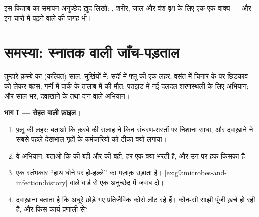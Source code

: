 \begin{exercise}[$\star\star\star$]\label{exo:g9:our-responsibility:12}
इस किताब का समापन अनुच्छेद ख़ुद लिखो: , शरीर, जाल और वंश-वृक्ष के
लिए एक-एक वाक्य --- और इन चारों में पढ़ने वाले की जगह भी।
\end{exercise}

\section{समस्या: स्नातक वाली जाँच-पड़ताल}

\begin{problem}[{सप्ताहांत समस्या --- किसी क़स्बे का एक साल, पूरी किताब
से जाँचा हुआ}]\label{pb:g9:our-responsibility:1}
तुम्हारे क़स्बे का (कल्पित) साल, सुर्ख़ियों में: सर्दी में फ़्लू की एक
लहर; वसंत में चिनार के  पर छिड़काव को लेकर बहस; गर्मी में पार्क के
तालाब में  की मौत; पतझड़ में नई दलदल-शरणस्थली के लिए अभियान; और
साल भर, दवाख़ाने के  तथा दान वाले अभियान।

\medskip\noindent\textbf{भाग I --- सेहत वाली फ़ाइल।}
\begin{enumerate}
  \item फ़्लू की लहर: बताओ कि क़स्बे की सलाह ने किन संचरण-रास्तों पर
        निशाना साधा, और दवाख़ाने ने सबसे पहले देखभाल-गृहों के
        कर्मचारियों को टीका क्यों लगाया।
  \item वे अभियान: बताओ कि  की बही और  की बही, हर एक क्या
        भरती है, और उन पर हक़ किसका है।
  \item एक स्तंभकार ``हाथ धोने पर हो-हल्ले'' का मज़ाक़ उड़ाता है।
        \cref{ex:g9:microbes-and-infection:history} वाले वार्ड से एक
        अनुच्छेद में जवाब दो।
  \item दवाख़ाना बताता है कि अधूरे छोड़े गए प्रतिजैविक कोर्स लौट रहे
        हैं। कौन-सी साझी पूँजी ख़र्च हो रही है, और किस कार्य-प्रणाली
        से?
\end{enumerate}


\end{problem}
